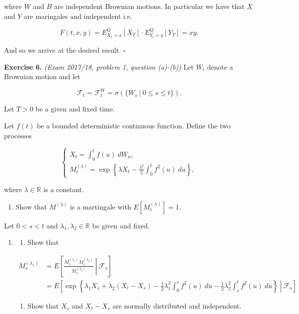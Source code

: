 \documentclass[a4paper,12pt,openany]{book}
\providecommand{\tightlist}{%
 \setlength{\itemsep}{0pt}\setlength{\parskip}{0pt}}
\begin{document}
where \(W\) and \(B\) are independent Brownian motions. In particular we have that \(X\) and \(Y\) are maringales and independent i.e.

\[
F(t,x,y)=E_{X_t=x}^Q[X_T]\cdot E_{Y_t=y}^Q[Y_T]=xy.
\]

And so we arrive at the desired result. \(\square\)

\textbf{Exercise 6.} \emph{(Exam 2017/18, problem 1, question (a)-(b))} Let \(W_t\) denote a Brownian motion and let

\[
\mathcal{F}_t=\mathcal{F}_t^W=\sigma(\{W_s\ \vert\ 0\le s\le t\}).
\]

Let \(T>0\) be a given and fixed time.

Let \(f(t)\) be a bounded deterministic continuous function. Define the two processes

\[
\begin{cases}
X_t=\int_0^tf(u)\ dW_u,\\
M^{(\lambda)}_t=\exp\left\{\lambda X_t-\frac{\lambda^2}{2}\int_0^t f^2(u)\ du\right\},
\end{cases}
\]

where \(\lambda\in\mathbb{R}\) is a constant.

\begin{enumerate}
\def\labelenumi{\alph{enumi}.}
\tightlist
\item
  Show that \(M^{(\lambda)}\) is a martingale with \(E[M_t^{(\lambda)}]=1\).
\end{enumerate}

Let \(0<s<t\) and \(\lambda_1,\lambda_2\in \mathbb{R}\) be given and fixed.

\begin{enumerate}
\def\labelenumi{\alph{enumi}.}
\setcounter{enumi}{1}
\item
  \begin{enumerate}
  \def\labelenumii{\roman{enumii}.}
  \tightlist
  \item
    Show that
  \end{enumerate}

  \begin{align*}
  M^{(\lambda_1)}_s&=E\left[\left.\frac{M^{(\lambda_1)}_sM^{(\lambda_2)}_t}{M^{(\lambda_2)}_s} \ \right\vert\ \mathcal{F}_s\right]\\
  &=E\left[\left.\exp\left\{\lambda_1X_s+\lambda_2(X_t-X_s)-\frac{1}{2}\lambda_1^2\int_0^sf^2(u)\ du- \frac{1}{2}\lambda_2^2\int_s^tf^2(u)\ du\right\} \ \right\vert\ \mathcal{F}_s\right]
  \end{align*}

  \begin{enumerate}
  \def\labelenumii{\roman{enumii}.}
  \setcounter{enumii}{1}
  \tightlist
  \item
    Show that \(X_s\) and \(X_t-X_s\) are normally distributed and independent.
  \end{enumerate}
\end{enumerate}
\end{document}
